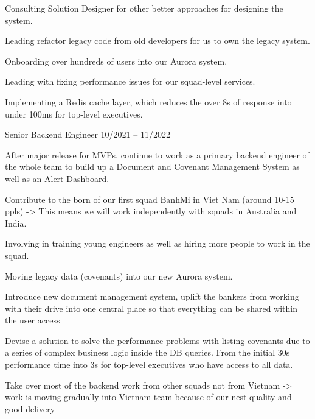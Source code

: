 \begin{cventries}
{\begin{cvitems}
            \item {Consulting Solution Designer for other better approaches for designing the system.}
            \item {Leading refactor legacy code from old developers for us to own the legacy system.}
            \item {Onboarding over hundreds of users into our Aurora system.}
            \item {Leading with fixing performance issues for our squad-level services.}
            \item {Implementing a Redis cache layer, which reduces the over 8s of response into under 100ms for top-level executives.}
        \end{cvitems}
    }

    
    \cventry
    {Senior Backend Engineer} %
    {} %
    {} %
    {10/2021 -- 11/2022} %
    {
        \begin{cvitems} %
            \item{After major release for MVPs, continue to work as a primary backend engineer of the whole team to build up a Document and Covenant Management System as well as an Alert Dashboard.}
            \item {Contribute to the born of our first squad BanhMi in Viet Nam (around 10-15 ppls) -> This means we will work independently with squads in Australia and India.}
            \item {Involving in training young engineers as well as hiring more people to work in the squad.}
            \item {Moving legacy data (covenants) into our new Aurora system.}
            \item {Introduce new document management system, uplift the bankers from working with their drive into one central place so that everything can be shared within the user access}
            \item {Devise a solution to solve the performance problems with listing covenants due to a series of complex business logic inside the DB queries. From the initial 30s performance time into 3s for top-level executives who have access to all data.}
            \item {Take over most of the backend work from other squads not from Vietnam -> work is moving gradually into Vietnam team because of our nest quality and good delivery}
        \end{cvitems}
    }


\end{cventries}
